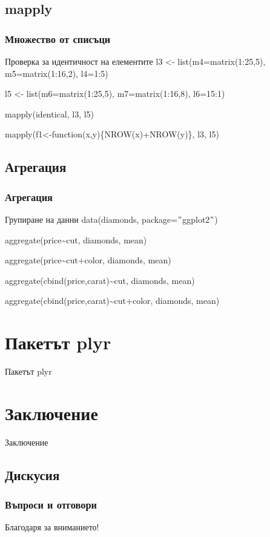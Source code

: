 \documentclass{beamer}
\begin{document}
\subsection{mapply}

\begin{frame}
\frametitle{Множество от списъци}
\begin{block}{Проверка за идентичност на елементите}
l3 <- list(m4=matrix(1:25,5), m5=matrix(1:16,2), l4=1:5)

l5 <- list(m6=matrix(1:25,5), m7=matrix(1:16,8), l6=15:1)

mapply(identical, l3, l5)

mapply(f1<-function(x,y)\{NROW(x)+NROW(y)\}, l3, l5)
\end{block}
\end{frame}

\subsection{Агрегация}

\begin{frame}
\frametitle{Агрегация}
\begin{block}{Групиране на данни}
data(diamonds, package=$"$ggplot2$"$)

aggregate(price\textasciitilde cut, diamonds, mean)

aggregate(price\textasciitilde cut+color, diamonds, mean)

aggregate(cbind(price,carat)\textasciitilde cut, diamonds, mean)

aggregate(cbind(price,carat)\textasciitilde cut+color, diamonds, mean)
\end{block}
\end{frame}

\section{Пакетът plyr}

\begin{frame}
\center \huge{Пакетът plyr}
\end{frame}

\section{Заключение}

\begin{frame}
\center \huge{Заключение}
\end{frame}

\subsection{Дискусия}

\begin{frame}
\frametitle{Въпроси и отговори}
\center \huge{Благодаря за вниманието!}
\end{frame}
\end{document}
